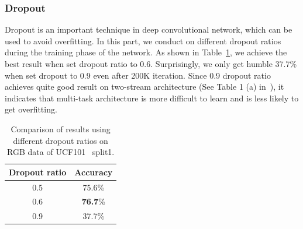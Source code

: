 \documentclass[10pt,twocolumn,letterpaper]{article}
\begin{document}
\subsubsection{Dropout}
Dropout is an important technique in deep convolutional network, which can be used to avoid overfitting. In this part, we conduct on different dropout ratios during the training phase of the network. As shown in Table~\ref{table:dropout}, we achieve the best result when set dropout ratio to 0.6. Surprisingly, we only get humble 37.7\% when set dropout to 0.9 even after 200K iteration. Since 0.9 dropout ratio achieves quite good result on two-stream architecture (See Table 1 (a) in~\cite{simonyan2014two}), it indicates that multi-task architecture is more difficult to learn and is  less likely to get overfitting. 
\begin{table}
	\begin{center}
		\begin{tabular}{|c|c|}
			\hline
			Dropout ratio 							& Accuracy \\		
			\hline												
			0.5										& 75.6\% \\
			0.6										& \textbf{76.7}\% \\
			0.9										& 37.7\% \\
			\hline																				
		\end{tabular}
	\end{center}
	\caption{Comparison of results using different dropout ratios on RGB data of UCF101~\cite{soomro2012ucf101} split1. }
	\label{table:dropout}
\end{table}
\end{document}
